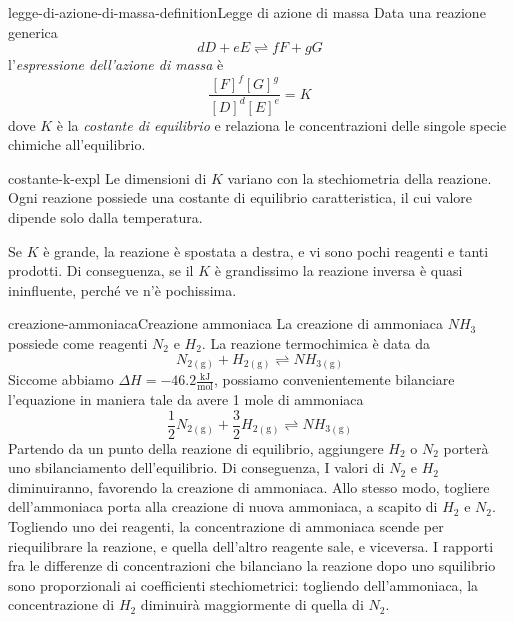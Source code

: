 \documentclass[preview]{standalone}
\begin{document}

\begin{snippetdefinition}{legge-di-azione-di-massa-definition}{Legge di azione di massa}
    Data una reazione generica
    \[
        dD + eE \rightleftharpoons fF + gG
    \]
    l'\textit{espressione dell'azione di massa} è
    \[ \frac{{[F]}^f{[G]}^g}{{[D]}^d{[E]}^e} = K \]
    dove \(K\)  è la \textit{costante di equilibrio} e relaziona
    le concentrazioni delle singole specie chimiche all'equilibrio.
\end{snippetdefinition}

\begin{snippet}{costante-k-expl}
    Le dimensioni di \(K\) variano con la stechiometria della reazione.\\
    Ogni reazione possiede una costante di equilibrio caratteristica,
    il cui valore dipende solo dalla temperatura.

    Se \(K\) è grande, la reazione è spostata a destra,
    e vi sono pochi reagenti e tanti prodotti.
    Di conseguenza, se il \(K\) è grandissimo la reazione inversa è quasi
    ininfluente, perché ve n'è pochissima.
\end{snippet}

\begin{snippetexample}{creazione-ammoniaca}{Creazione ammoniaca}
    La creazione di ammoniaca \(NH_3\) possiede come reagenti \(N_2\) e \(H_2\).
    La reazione termochimica è data da
    \[
        N_{2(\text{g})} + H_{2(\text{g})}   \rightleftharpoons NH_{3(\text{g})}      
    \]
    Siccome abbiamo \(\Delta H = -46.2 \frac{\text{kJ}}{\text{mol}}\),
    possiamo convenientemente bilanciare l'equazione in maniera tale da avere 1 mole di ammoniaca
    \[
        \frac{1}{2}N_{2(\text{g})} + \frac{3}{2}H_{2(\text{g})}   \rightleftharpoons NH_{3(\text{g})}
    \]
    Partendo da un punto della reazione di equilibrio,
    aggiungere \(H_2\) o \(N_2\) porterà uno sbilanciamento dell'equilibrio.
    Di conseguenza,
    I valori di \(N_2\) e \(H_2\) diminuiranno, favorendo la creazione di ammoniaca.
    Allo stesso modo, togliere dell'ammoniaca porta alla creazione di nuova ammoniaca, a scapito
    di \(H_2\) e \(N_2\).
    Togliendo uno dei reagenti, la concentrazione di ammoniaca scende per riequilibrare la reazione,
    e quella dell'altro reagente sale, e viceversa.
    I rapporti fra le differenze di concentrazioni che bilanciano la reazione dopo
    uno squilibrio sono proporzionali ai coefficienti stechiometrici:
    togliendo dell'ammoniaca, la concentrazione di \(H_2\) diminuirà maggiormente di quella di \(N_2\).
\end{snippetexample}
\end{document}
